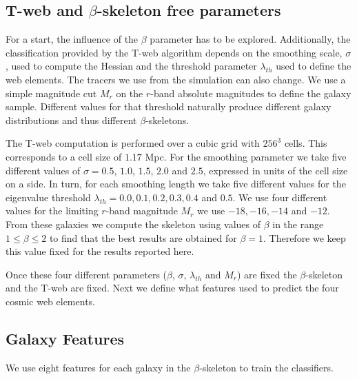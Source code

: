 \documentclass[usenatbib]{mnras}
\begin{document}
\subsection{T-web and $\beta$-skeleton free parameters}

For a start, the influence of the $\beta$ parameter has to be explored.
Additionally, the classification provided by the T-web algorithm
depends on the smoothing scale, $\sigma$, used to compute the Hessian and the
threshold parameter $\lambda_{th}$ used to define the web elements.
The tracers we use from the simulation can also change. 
We use a simple magnitude cut $M_{r}$ on the $r$-band absolute magnitudes
to define the galaxy sample. 
Different values for that threshold naturally produce different galaxy
distributions and thus different $\beta$-skeletons. 

The T-web computation is performed over a cubic grid with $256^3$
cells.  
This corresponds to a cell size of $1.17$ Mpc.
For the smoothing parameter we take five different values of $\sigma =
0.5$, $1.0$, $1.5$, $2.0$ and $2.5$, expressed in units of the cell
size on a side.   
In turn, for each smoothing length we take five different values for
the eigenvalue threshold
$\lambda_{th}=0.0, 0.1, 0.2, 0.3, 0.4$ and $0.5$. 
We use four different values for the limiting $r$-band magnitude
$M_{r}$ we use  $-18, -16, -14$ and $-12$.
From these galaxies we compute the skeleton using values of $\beta$ in
the range $1\leq \beta \leq 2$ to find that the best results are
obtained for $\beta=1$.   
Therefore we keep this value fixed for the results reported here.

Once these four different parameters ($\beta$,
$\sigma$, $\lambda_{th}$ and $M_{r}$) are fixed the $\beta$-skeleton and the
T-web are fixed.  
Next we define what features used to predict the four cosmic web elements.

\subsection{Galaxy Features}
We use eight features for each galaxy in the $\beta$-skeleton to train the classifiers. 
\end{document}

